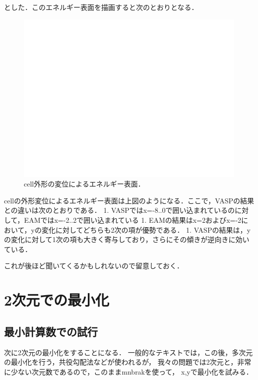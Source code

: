とした．このエネルギー表面を描画すると次のとおりとなる．

\begin{figure}[H][htbp]
\centering
\begin{center}
\includegraphics[width=150mm]{../.././figs/thesis/thesis_007.jpeg}
\end{center}
\caption{cell外形の変位によるエネルギー表面．\label{spandata-label}}

\label{fig:}
\end{figure}

    cellの外形変位によるエネルギー表面は上図のようになる．ここで，VASPの結果との違いは次のとおりである．
1.
VASPではx=-8..0で囲い込まれているのに対して，EAMではx=-2..2で囲い込まれている
1.
EAMの結果はx=2およびx=-2において，yの変化に対してどちらも2次の項が優勢である．
1.
VASPの結果は，yの変化に対して1次の項も大きく寄与しており，さらにその傾きが逆向きに効いている．

これが後ほど聞いてくるかもしれないので留意しておく．

    \section{2次元での最小化}\label{ux6b21ux5143ux3067ux306eux6700ux5c0fux5316}

\subsection{最小計算数での試行}\label{ux6700ux5c0fux8a08ux7b97ux6570ux3067ux306eux8a66ux884c}

次に2次元の最小化をすることになる．
一般的なテキストでは，この後，多次元の最小化を行う，共役勾配法などが使われるが，
我々の問題では2次元と，非常に少ない次元数であるので，このままmnbrakを使って，
x,yで最小化を試みる．

